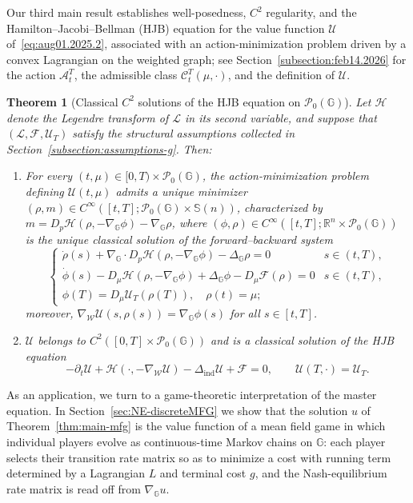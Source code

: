 \documentclass[10pt]{article}
\newtheorem{theorem}{Theorem}[section]
\numberwithin{equation}{section}
\newcommand{\cA}{ \mathcal{A}}
\newcommand{\cC}{ \mathcal{C}}
\newcommand{\cF}{ \mathcal{F}}
\newcommand{\cH}{ \mathcal{H}}
\newcommand{\cL}{ \mathcal{L}}
\newcommand{\cP}{ \mathcal{P}}
\newcommand{\cU}{ \mathcal{U}}
\newcommand{\cW}{ \mathcal{W}}
\newcommand{\bG}{\mathbb G}
\newcommand{\R}{\mathbb R}
\newcommand{\bS}{\mathbb S}
\def\R{{\mathbb{R}}}
\def\cH{\mathcal{H}}
\def\cL{\mathcal{L}}
\def\G{\mathbb{G}}
\begin{document}
Our third main result establishes well-posedness, $C^2$ regularity, and the Hamilton--Jacobi--Bellman (HJB) equation for the value function $\cU$ of~\eqref{eq:aug01.2025.2}, associated with an action-minimization problem driven by a convex Lagrangian on the weighted graph; see Section~\ref{subsection:feb14.2026} for the action $\cA_t^T$, the admissible class $\cC_t^T(\mu,\cdot)$, and the definition of $\cU$.

\begin{theorem}[Classical $C^2$ solutions of the HJB equation on $\cP_0(\G)$]\label{thm:main-hjb}
Let $\cH$ denote the Legendre transform of $\cL$ in its second variable, and suppose that $(\cL,\cF,\cU_T)$ satisfy the structural assumptions collected in Section~\ref{subsection:assumptions-g}. Then:
\begin{enumerate}
\item[(i)] For every $(t,\mu)\in[0,T)\times\cP_0(\G)$, the action-minimization problem defining $\cU(t,\mu)$ admits a unique minimizer $(\rho,m)\in C^\infty([t,T];\cP_0(\G)\times\bS(n))$, characterized by $m=D_p\cH(\rho,-\nabla_\G\phi)-\nabla_\G\rho$, where $(\phi,\rho)\in C^\infty([t,T];\R^n\times\cP_0(\G))$ is the unique classical solution of the forward--backward system
\begin{equation}\label{eq:mfg-withcH}
\begin{cases}
\dot\rho(s)+\nabla_\G\cdot D_p\cH(\rho,-\nabla_\G\phi)-\Delta_\G\rho=0 & s\in(t,T),\\
\dot\phi(s)-D_\mu\cH(\rho,-\nabla_\G\phi)+\Delta_\G\phi-D_\mu\cF(\rho)=0 & s\in(t,T),\\
\phi(T)=D_\mu\cU_T(\rho(T)),\quad \rho(t)=\mu;
\end{cases}
\end{equation}
moreover, $\nabla_\cW\cU(s,\rho(s))=\nabla_\G\phi(s)$ for all $s\in[t,T]$.
\item[(ii)] $\cU$ belongs to $C^2([0,T]\times\cP_0(\G))$ and is a classical solution of the HJB equation
\[
-\partial_t\cU+\cH(\cdot,-\nabla_\cW\cU)-\Delta_{\text{ind}}\cU+\cF=0,\qquad \cU(T,\cdot)=\cU_T.
\]
\end{enumerate}
\end{theorem}


As an application, we turn to a game-theoretic interpretation of the master equation. In Section~\ref{sec:NE-discreteMFG} we show that the solution $u$ of Theorem~\ref{thm:main-mfg} is the value function of a mean field game in which individual players evolve as continuous-time Markov chains on $\bG$: each player selects their transition rate matrix so as to minimize a cost with running term determined by a Lagrangian $L$ and terminal cost $g$, and the Nash-equilibrium rate matrix is read off from $\nabla_\G u$.
\end{document}
